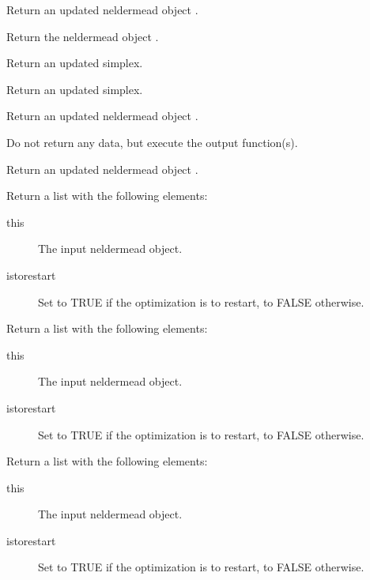 %
\begin{Value}
\begin{description}

\item[] Return an updated neldermead object
.
\item[] Return the neldermead object .
\item[] Return an updated simplex.
\item[] Return an updated simplex.
\item[] Return an updated neldermead object
.
\item[] Do not return any data, but execute the
output function(s).
\item[] Return an updated neldermead object
.
\item[] Return a list with the following
elements:\begin{description}

\item[this] The input neldermead object.
\item[istorestart] Set to TRUE if the optimization is to restart, to FALSE
otherwise.

\end{description}


\item[] Return a list with the following elements:
\begin{description}

\item[this] The input neldermead object.
\item[istorestart] Set to TRUE if the optimization is to restart, to FALSE
otherwise.

\end{description}


\item[] Return a list with the following elements:
\begin{description}

\item[this] The input neldermead object.
\item[istorestart] Set to TRUE if the optimization is to restart, to FALSE
otherwise.

\end{description}



\end{description}
\end{Value}
